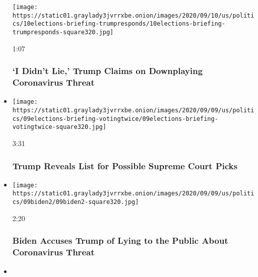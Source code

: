 \begin{itemize}
  \texttt{[image: https://static01.graylady3jvrrxbe.onion/images/2020/09/10/us/politics/10elections-briefing-trumpresponds/10elections-briefing-trumpresponds-square320.jpg]}

  1:07

  \hypertarget{i-didnt-lie-trump-claims-on-downplaying-coronavirus-threat}{%
  \subsubsection{`I Didn't Lie,' Trump Claims on Downplaying Coronavirus
  Threat}\label{i-didnt-lie-trump-claims-on-downplaying-coronavirus-threat}}
\item
  \href{https://www.nytimes3xbfgragh.onion/video/us/politics/100000007332233/trump-supreme-court-list.html?action=click\&module=video-series-bar\&region=header\&pgtype=Article\&playlistId=video/us-politics}{}

  \texttt{[image: https://static01.graylady3jvrrxbe.onion/images/2020/09/09/us/politics/09elections-briefing-votingtwice/09elections-briefing-votingtwice-square320.jpg]}

  3:31

  \hypertarget{trump-reveals-list-for-possible-supreme-court-picks}{%
  \subsubsection{Trump Reveals List for Possible Supreme Court
  Picks}\label{trump-reveals-list-for-possible-supreme-court-picks}}
\item
  \href{https://www.nytimes3xbfgragh.onion/video/us/politics/100000007331572/biden-trump-woodward-covid-michigan.html?action=click\&module=video-series-bar\&region=header\&pgtype=Article\&playlistId=video/us-politics}{}

  \texttt{[image: https://static01.graylady3jvrrxbe.onion/images/2020/09/09/us/politics/09biden2/09biden2-square320.jpg]}

  2:20

  \hypertarget{biden-accuses-trump-of-lying-to-the-public-about-coronavirus-threat}{%
  \subsubsection{Biden Accuses Trump of Lying to the Public About
  Coronavirus
  Threat}\label{biden-accuses-trump-of-lying-to-the-public-about-coronavirus-threat}}
\item
  \href{https://www.nytimes3xbfgragh.onion/video/us/politics/100000007331976/mcenany-trump-covid-virus.html?action=click\&module=video-series-bar\&region=header\&pgtype=Article\&playlistId=video/us-politics}{}


\end{itemize}
